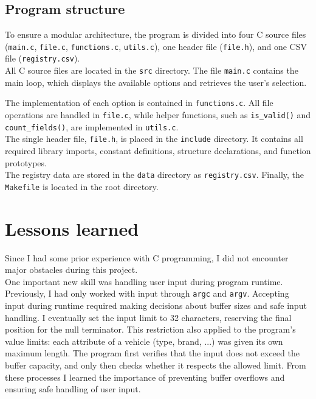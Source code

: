 \documentclass[12pt, a4paper]{article}
\begin{document}
\subsection{Program structure}

To ensure a modular architecture, the program is divided into four C source files (\texttt{main.c}, \texttt{file.c}, \texttt{functions.c}, \texttt{utils.c}), one header file (\texttt{file.h}), and one CSV file (\texttt{registry.csv}). \\

All C source files are located in the \texttt{src} directory. The file \texttt{main.c} contains the main loop, which displays the available options and retrieves the user’s selection. 

The implementation of each option is contained in \texttt{functions.c}. All file operations are handled in \texttt{file.c}, while helper functions, such as \texttt{is\_valid()} and \texttt{count\_fields()}, are implemented in \texttt{utils.c}. \\

The single header file, \texttt{file.h}, is placed in the \texttt{include} directory. It contains all required library imports, constant definitions, structure declarations, and function prototypes. \\

The registry data are stored in the \texttt{data} directory as \texttt{registry.csv}. Finally, the \texttt{Makefile} is located in the root directory.

\section{Lessons learned}

Since I had some prior experience with C programming, I did not encounter major obstacles during this project. \\

One important new skill was handling user input during program runtime. Previously, I had only worked with input through \texttt{argc} and \texttt{argv}. Accepting input during runtime required making decisions about buffer sizes and safe input handling. I eventually set the input limit to 32 characters, reserving the final position for the null terminator. This restriction also applied to the program’s value limits: each attribute of a vehicle (type, brand, ...) was given its own maximum length. The program first verifies that the input does not exceed the buffer capacity, and only then checks whether it respects the allowed limit. From these processes I learned the importance of preventing buffer overflows and ensuring safe handling of user input. \\
\end{document}
